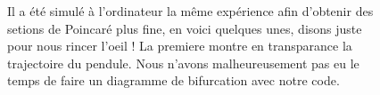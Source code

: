 \documentclass[a4paper,12pt,oneside]{article}
\begin{document}
\begin{figure}[!ht]
    \hfill
    \hfill
    \caption{Il a été simulé à l'ordinateur la même expérience afin d'obtenir des setions de Poincaré plus fine, en voici quelques unes, disons juste pour nous rincer l'oeil ! La premiere montre en transparance la trajectoire du pendule. Nous n'avons malheureusement pas eu le temps de faire un diagramme de bifurcation avec notre code.}
    \label{fig:poincare_beauty}
\end{figure}
\end{document}
